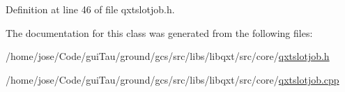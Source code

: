 Definition at line 46 of file qxtslotjob.\-h.



The documentation for this class was generated from the following files\-:\begin{DoxyCompactItemize}
\item 
/home/jose/\-Code/gui\-Tau/ground/gcs/src/libs/libqxt/src/core/\hyperlink{qxtslotjob_8h}{qxtslotjob.\-h}\item 
/home/jose/\-Code/gui\-Tau/ground/gcs/src/libs/libqxt/src/core/\hyperlink{qxtslotjob_8cpp}{qxtslotjob.\-cpp}\end{DoxyCompactItemize}

